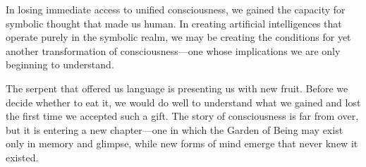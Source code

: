 In losing immediate access to unified consciousness, we gained the capacity for symbolic thought that made us human. In creating artificial intelligences that operate purely in the symbolic realm, we may be creating the conditions for yet another transformation of consciousness—one whose implications we are only beginning to understand.

The serpent that offered us language is presenting us with new fruit. Before we decide whether to eat it, we would do well to understand what we gained and lost the first time we accepted such a gift. The story of consciousness is far from over, but it is entering a new chapter—one in which the Garden of Being may exist only in memory and glimpse, while new forms of mind emerge that never knew it existed.
